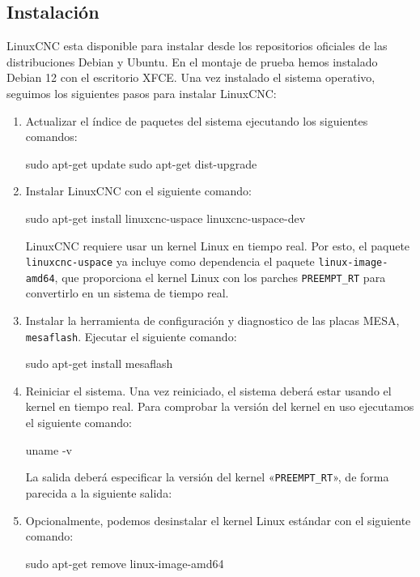 \documentclass[english,spanish,a4paper,11pt]{article}
\begin{document}
\subsection{Instalación}
\label{sec:linuxcnc_installation}

LinuxCNC esta disponible para instalar desde los repositorios oficiales de las distribuciones Debian y Ubuntu. En el montaje de prueba hemos instalado Debian 12 con el escritorio XFCE. Una vez instalado el sistema operativo, seguimos los siguientes pasos para instalar LinuxCNC:

\begin{enumerate}
    \item Actualizar el índice de paquetes del sistema ejecutando los siguientes comandos:
\begin{listingbox}
sudo apt-get update
sudo apt-get dist-upgrade
\end{listingbox}

    \item Instalar LinuxCNC con el siguiente comando:
\begin{listingbox}
sudo apt-get install linuxcnc-uspace linuxcnc-uspace-dev
\end{listingbox}

    LinuxCNC requiere usar un kernel Linux en tiempo real. Por esto, el paquete \texttt{linuxcnc-uspace} ya incluye como dependencia el paquete \texttt{linux-image-amd64}, que proporciona el kernel Linux con los parches \texttt{PREEMPT\_RT} para convertirlo en un sistema de tiempo real.

    \item Instalar la herramienta de configuración y diagnostico de las placas MESA, \texttt{mesaflash}. Ejecutar el siguiente comando:
\begin{listingbox}
sudo apt-get install mesaflash
\end{listingbox}

    \item Reiniciar el sistema. Una vez reiniciado, el sistema deberá estar usando el kernel en tiempo real. Para comprobar la versión del kernel en uso ejecutamos el siguiente comando:
\begin{listingbox}
uname -v
\end{listingbox}

    La salida deberá especificar la versión del kernel «\texttt{PREEMPT\_RT}», de forma parecida a la siguiente salida:

    \item Opcionalmente, podemos desinstalar el kernel Linux estándar con el siguiente comando:
\begin{listingbox}
sudo apt-get remove linux-image-amd64
\end{listingbox}
\end{enumerate}
\end{document}
